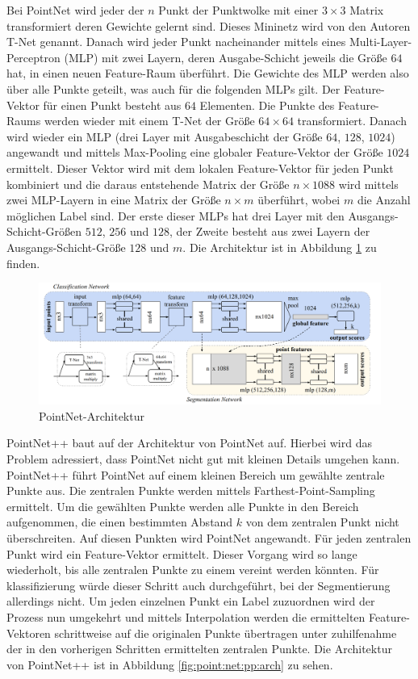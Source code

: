 \documentclass[12pt,titlepage, twoside]{article}
\begin{document}
Bei PointNet wird jeder der $n$ Punkt der Punktwolke mit einer $3\times 3$ Matrix transformiert deren Gewichte gelernt sind. Dieses Mininetz wird von den Autoren T-Net genannt.
Danach wird jeder Punkt nacheinander mittels eines Multi-Layer-Perceptron (MLP) mit zwei Layern, deren Ausgabe-Schicht jeweils die Größe $64$ hat, in einen neuen Feature-Raum überführt. 
Die Gewichte des MLP werden also über alle Punkte geteilt, was auch für die folgenden MLPs gilt. Der Feature-Vektor für einen Punkt besteht aus $64$ Elementen.
Die Punkte des Feature-Raums werden wieder mit einem T-Net der Größe $64\times 64$ transformiert. Danach wird wieder ein MLP (drei Layer mit Ausgabeschicht der Größe $64$, $128$, $1024$) angewandt und mittels Max-Pooling eine globaler Feature-Vektor der Größe $1024$ ermittelt. 
Dieser Vektor wird mit dem lokalen Feature-Vektor für jeden Punkt kombiniert und die daraus entstehende Matrix der Größe $n\times 1088$ wird mittels zwei MLP-Layern in eine Matrix der Größe $n\times m$ überführt, wobei $m$ die Anzahl möglichen Label sind.
Der erste dieser MLPs hat drei Layer mit den Ausgangs-Schicht-Größen $512$, $256$ und $128$, der Zweite besteht aus zwei Layern der Ausgangs-Schicht-Größe $128$ und $m$.
Die Architektur ist in Abbildung \ref{fig:point:net:arch} zu finden.

\begin{figure}
    \centering
    \includegraphics[width=1.0\textwidth]{./Images/PointNetArchitektur.png}
    \caption{PointNet-Architektur \cite{qi2017pointnet}}
    \label{fig:point:net:arch}
\end{figure}

PointNet++ baut auf der Architektur von PointNet auf. Hierbei wird das Problem adressiert, dass PointNet nicht gut mit kleinen Details umgehen kann. 
PointNet++ führt PointNet auf einem kleinen Bereich um gewählte zentrale Punkte aus. Die zentralen Punkte werden mittels Farthest-Point-Sampling ermittelt. 
Um die gewählten Punkte werden alle Punkte in den Bereich aufgenommen, die einen bestimmten Abstand $k$ von dem zentralen Punkt nicht überschreiten. 
Auf diesen Punkten wird PointNet angewandt. Für jeden zentralen Punkt wird ein Feature-Vektor ermittelt.
Dieser Vorgang wird so lange wiederholt, bis alle zentralen Punkte zu einem vereint werden könnten. Für klassifizierung würde dieser Schritt auch durchgeführt, bei der Segmentierung allerdings nicht.
Um jeden einzelnen Punkt ein Label zuzuordnen wird der Prozess nun umgekehrt und mittels Interpolation werden die ermittelten Feature-Vektoren schrittweise auf die originalen Punkte übertragen 
unter zuhilfenahme der in den vorherigen Schritten ermittelten zentralen Punkte.
Die Architektur von PointNet++ ist in Abbildung \ref{fig:point:net:pp:arch} zu sehen.
\end{document}
